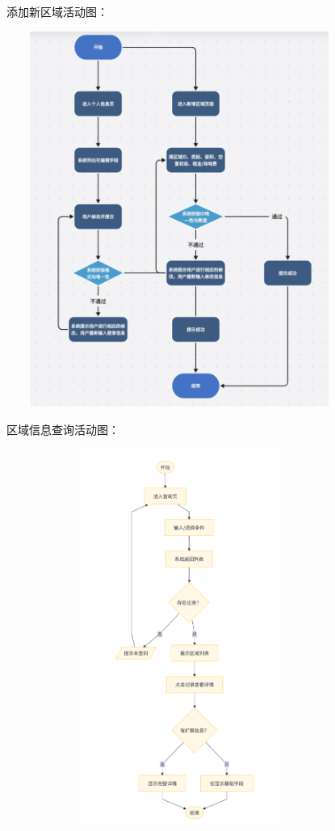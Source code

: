\documentclass[]{article}
\begin{document}
添加新区域活动图：

\includegraphics[width=4.45694in,height=4.83819in]{media/media/image_2-3-1.png}

区域信息查询活动图：

\includegraphics[width=4.45694in,height=4.83819in]{media/media/image_2-3-2.png}
\end{document}

